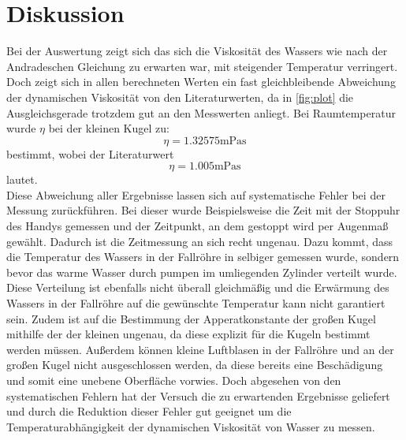 \section{Diskussion}
\label{sec:Diskussion}
Bei der Auswertung zeigt sich das sich die Viskosität des Wassers wie nach der Andradeschen Gleichung zu erwarten war,
mit steigender Temperatur verringert. Doch zeigt sich in allen berechneten Werten ein fast gleichbleibende Abweichung
der dynamischen Viskosität von den Literaturwerten, da in \autoref{fig:plot} die Ausgleichsgerade trotzdem gut an den Messwerten anliegt.
Bei Raumtemperatur wurde $\eta$ bei der kleinen Kugel zu:
\begin{equation*}
    \eta = 1.32575\unit{\milli\pascal\second}
\end{equation*}
bestimmt, wobei der Literaturwert
\begin{equation*}
    \eta = 1.005\unit{\milli\pascal\second}
\end{equation*}
lautet.\\
Diese Abweichung aller Ergebnisse lassen sich auf systematische Fehler bei der Messung zurückführen.
Bei dieser wurde Beispielsweise die Zeit mit der Stoppuhr des Handys gemessen und der Zeitpunkt, an dem
gestoppt wird per Augenmaß gewählt. Dadurch ist die Zeitmessung an sich recht ungenau. Dazu kommt, dass die
Temperatur des Wassers in der Fallröhre in selbiger gemessen wurde, sondern bevor das warme Wasser durch pumpen
im umliegenden Zylinder verteilt wurde. Diese Verteilung ist ebenfalls nicht überall gleichmäßig und die Erwärmung des
Wassers in der Fallröhre auf die gewünschte Temperatur kann nicht garantiert sein. Zudem ist auf die Bestimmung der Apperatkonstante
der großen Kugel mithilfe der der kleinen ungenau, da diese explizit für die Kugeln bestimmt werden müssen. Außerdem können kleine Luftblasen
in der Fallröhre und an der großen Kugel nicht ausgeschlossen werden, da diese bereits eine Beschädigung und somit eine unebene Oberfläche vorwies.
Doch abgesehen von den systematischen Fehlern hat der Versuch die zu erwartenden Ergebnisse geliefert und durch die Reduktion dieser Fehler gut geeignet
um die Temperaturabhängigkeit der dynamischen Viskosität von Wasser zu messen.
